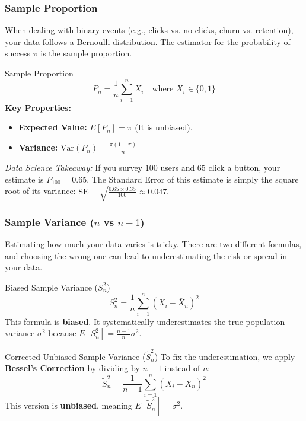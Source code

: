 \subsubsection{Sample Proportion}
When dealing with binary events (e.g., clicks vs. no-clicks, churn vs. retention), your data follows a Bernoulli distribution. The estimator for the probability of success $\pi$ is the sample proportion.

\begin{defbox}{Sample Proportion}
\begin{equation}
P_n = \frac{1}{n}\sum_{i=1}^{n} X_i \quad \text{where } X_i \in \{0, 1\}
\end{equation}
\textbf{Key Properties:}
\begin{itemize}
    \item \textbf{Expected Value:} $E[P_n] = \pi$ (It is unbiased).
    \item \textbf{Variance:} $\text{Var}(P_n) = \frac{\pi(1-\pi)}{n}$
\end{itemize}
\end{defbox}

\textit{Data Science Takeaway:} If you survey $100$ users and $65$ click a button, your estimate is $P_{100} = 0.65$. The Standard Error of this estimate is simply the square root of its variance: $\text{SE} = \sqrt{\frac{0.65 \times 0.35}{100}} \approx 0.047$. 

\subsubsection{Sample Variance ($n$ vs $n-1$)}
Estimating how much your data varies is tricky. There are two different formulas, and choosing the wrong one can lead to underestimating the risk or spread in your data.

\begin{defbox}{Biased Sample Variance ($S_n^2$)}
\begin{equation}
S_n^2 = \frac{1}{n}\sum_{i=1}^{n} (X_i - \bar{X}_n)^2
\end{equation}
This formula is \textbf{biased}. It systematically underestimates the true population variance $\sigma^2$ because $E[S_n^2] = \frac{n-1}{n}\sigma^2$.
\end{defbox}

\begin{defbox}{Corrected Unbiased Sample Variance ($\tilde{S}_n^2$)}
To fix the underestimation, we apply \textbf{Bessel's Correction} by dividing by $n-1$ instead of $n$:
\begin{equation}
\tilde{S}_n^2 = \frac{1}{n-1}\sum_{i=1}^{n} (X_i - \bar{X}_n)^2
\end{equation}
This version is \textbf{unbiased}, meaning $E[\tilde{S}_n^2] = \sigma^2$. 
\end{defbox}

